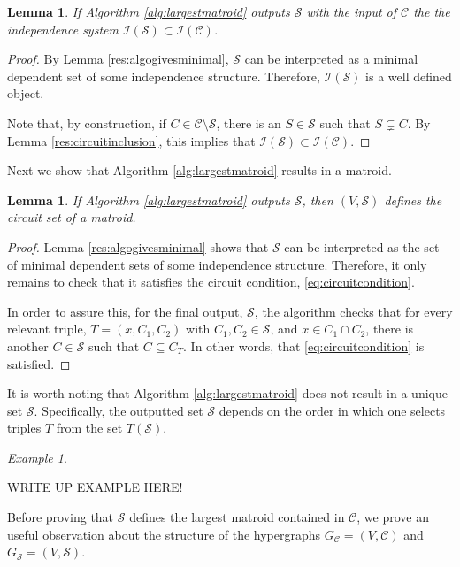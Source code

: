 \documentclass[11pt]{article}
\newcommand{\sI}{\mathscr{I}}
\newcommand{\sC}{\mathscr{C}}
\newcommand{\sS}{\mathscr{S}}
\newtheorem{lem}[thm]{Lemma}
\theoremstyle{remark}
\newtheorem{eg}[thm]{Example}
\theoremstyle{definition}
\begin{document}
\begin{lem}\label{ref:algogivesinclusion}
    If Algorithm \ref{alg:largestmatroid} outputs $\sS$ with the input of $\sC$ the the independence system $\sI(\sS) \subset \sI(\sC)$.
\end{lem}
\begin{proof}
    By Lemma \ref{res:algogivesminimal}, $\sS$ can be interpreted as a minimal dependent set of some independence structure. Therefore, $\sI(\sS)$ is a well defined object. 

    Note that, by construction, if $C \in \sC \setminus \sS$, there is an $S \in \sS$ such that $S \subsetneq C$.
    By Lemma \ref{res:circuitinclusion}, this implies that $\sI(\sS) \subset \sI(\sC)$. 
\end{proof}

Next we show that Algorithm \ref{alg:largestmatroid} results in a matroid.
\begin{lem} \label{res:algogivesmatroid} If Algorithm \ref{alg:largestmatroid} outputs $\sS$, then $(V, \sS)$ defines the circuit set of a matroid.
\end{lem}
\begin{proof}
    Lemma \ref{res:algogivesminimal} shows that $\sS$ can be interpreted as the set  of minimal dependent sets of some independence structure. Therefore, it only remains to check that it satisfies the circuit condition, \eqref{eq:circuitcondition}.

    In order to assure this, for the final output, $\sS$, the algorithm checks that for every relevant triple, $T = (x, C_1, C_2)$ with $C_1, C_2 \in \sS$, and $x \in C_1 \cap C_2$, there is another $C \in \sS$ such that $C \subseteq C_T$. In other words, that \eqref{eq:circuitcondition} is satisfied.
    \end{proof}

It is worth noting that Algorithm \ref{alg:largestmatroid} does not result in a unique set $\sS$. Specifically, the outputted set $\sS$ depends on the order in which one selects triples $T$ from the set $T(\sS)$. 

\begin{eg} \label{eg:ordermatters}

WRITE UP EXAMPLE HERE!
    
\end{eg}

Before proving that $\sS$ defines the largest matroid contained in $\sC$, we prove an useful observation about the structure of the hypergraphs $G_\sC = (V, \sC)$ and $G_\sS = (V, \sS)$.
\end{document}
